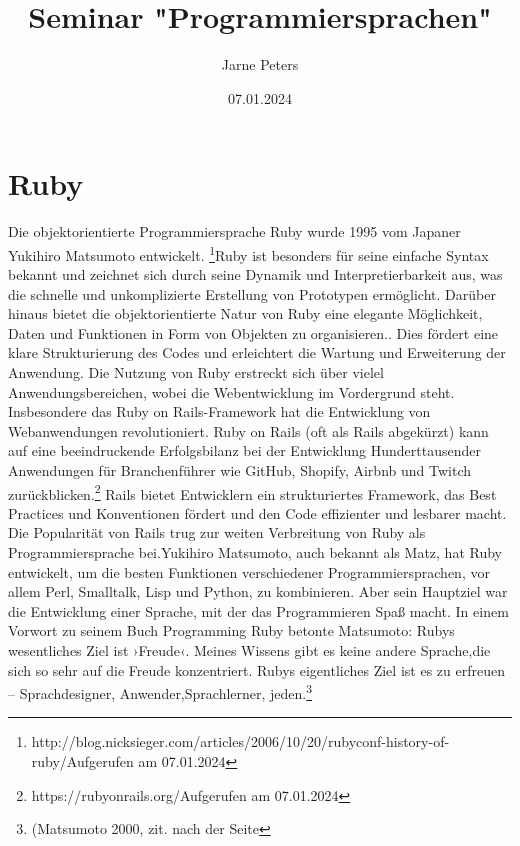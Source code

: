 \documentclass{article}
\title{Seminar "Programmiersprachen" }
\author{Jarne Peters}
\date{07.01.2024}
\begin{document}
\maketitle


\section*{Ruby}

Die objektorientierte Programmiersprache Ruby wurde 1995 vom Japaner Yukihiro Matsumoto entwickelt. \footnote{http://blog.nicksieger.com/articles/2006/10/20/rubyconf-history-of-ruby/Aufgerufen am 07.01.2024}Ruby ist besonders für seine einfache Syntax bekannt und zeichnet sich durch seine Dynamik und Interpretierbarkeit aus, was die schnelle und unkomplizierte Erstellung von Prototypen ermöglicht. Darüber hinaus bietet die objektorientierte Natur von Ruby eine elegante Möglichkeit, Daten und Funktionen in Form von Objekten zu organisieren.. Dies fördert eine klare Strukturierung des Codes und erleichtert die Wartung und Erweiterung der Anwendung. Die Nutzung von Ruby erstreckt sich über vielel Anwendungsbereichen, wobei die Webentwicklung im Vordergrund steht. Insbesondere das Ruby on Rails-Framework hat die Entwicklung von Webanwendungen revolutioniert. Ruby on Rails (oft als Rails abgekürzt) kann auf eine beeindruckende Erfolgsbilanz bei der Entwicklung Hunderttausender Anwendungen für Branchenführer wie GitHub, Shopify, Airbnb und Twitch zurückblicken.\footnote{https://rubyonrails.org/Aufgerufen am 07.01.2024} Rails bietet Entwicklern ein strukturiertes Framework, das Best Practices und Konventionen fördert und den Code effizienter und lesbarer macht. Die Popularität von Rails trug zur weiten Verbreitung von Ruby als Programmiersprache bei.Yukihiro Matsumoto, auch bekannt als Matz, hat Ruby entwickelt, um die besten Funktionen verschiedener Programmiersprachen, vor allem Perl, Smalltalk, Lisp und Python, zu kombinieren. Aber sein Hauptziel war die Entwicklung einer Sprache, mit der das Programmieren Spaß macht. In einem Vorwort zu seinem Buch 	\glqq Programming Ruby \grqq{} betonte Matsumoto: \glqq Rubys wesentliches Ziel ist ›Freude‹. Meines Wissens gibt es keine andere Sprache,die sich so sehr auf die Freude konzentriert. Rubys eigentliches Ziel ist es zu erfreuen – Sprachdesigner, Anwender,Sprachlerner, jeden.\grqq{}\footnote{(Matsumoto 2000, zit. nach der Seite
}
\end{document}
